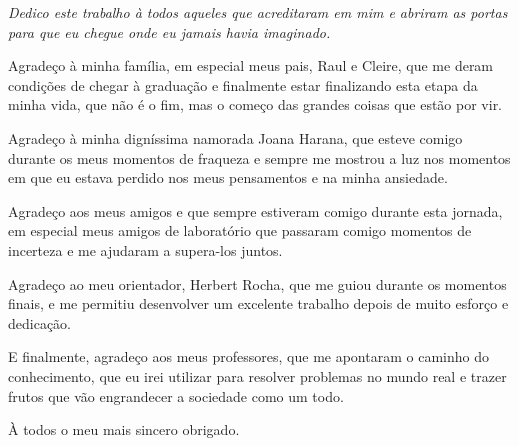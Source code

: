 \documentclass[
	12pt,				%
    oneside,
	a4paper,			%
	chapter=TITLE,		%
	english,			%
	brazil				%
	]{abntex2}
\begin{document}
\frenchspacing


\imprimircapa

\imprimirfolhaderosto

\imprimirfolhadeaprovacao

\begin{dedicatoria}
   \vspace*{\fill}
   \centering
   \noindent
   \textit{ Dedico este trabalho à todos aqueles que acreditaram em mim e abriram as portas para que eu chegue onde eu jamais havia imaginado. }
   \vspace*{\fill}
\end{dedicatoria}

\begin{agradecimentos}[agradecimentos]

Agradeço à minha família, em especial meus pais, Raul e Cleire, que me deram condições de chegar à graduação e finalmente estar finalizando esta etapa da minha vida, que não é o fim, mas o começo das grandes coisas que estão por vir.

Agradeço à minha digníssima namorada Joana Harana, que esteve comigo durante os meus momentos de fraqueza e sempre me mostrou a luz nos momentos em que eu estava perdido nos meus pensamentos e na minha ansiedade.

Agradeço aos meus amigos e que sempre estiveram comigo durante esta jornada, em especial meus amigos de laboratório que passaram comigo momentos de incerteza e me ajudaram a supera-los juntos.

Agradeço ao meu orientador, Herbert Rocha, que me guiou durante os momentos finais, e me permitiu desenvolver um excelente trabalho depois de muito esforço e dedicação.

E finalmente, agradeço aos meus professores, que me apontaram o caminho do conhecimento, que eu irei utilizar para resolver problemas no mundo real e trazer frutos que vão engrandecer a sociedade como um todo.

À todos o meu mais sincero obrigado.
\end{agradecimentos}
\end{document}
